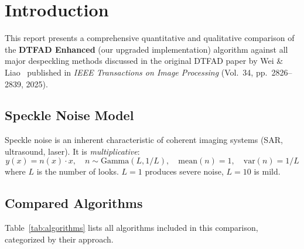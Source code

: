 \documentclass[12pt,a4paper]{article}
\begin{document}
\tableofcontents
\newpage

\section{Introduction}

This report presents a comprehensive quantitative and qualitative comparison of the \textbf{DTFAD Enhanced} (our upgraded implementation) algorithm against all major despeckling methods discussed in the original DTFAD paper by Wei \& Liao~\cite{wei2025dtfad} published in \textit{IEEE Transactions on Image Processing} (Vol.~34, pp.~2826--2839, 2025).

\subsection{Speckle Noise Model}

Speckle noise is an inherent characteristic of coherent imaging systems (SAR, ultrasound, laser). It is \textit{multiplicative}:
\begin{equation}
y(x) = n(x) \cdot x, \quad n \sim \text{Gamma}(L, 1/L), \quad \text{mean}(n) = 1, \quad \text{var}(n) = 1/L
\end{equation}
where $L$ is the number of looks. $L=1$ produces severe noise, $L=10$ is mild.

\subsection{Compared Algorithms}

Table~\ref{tab:algorithms} lists all algorithms included in this comparison, categorized by their approach.
\end{document}
